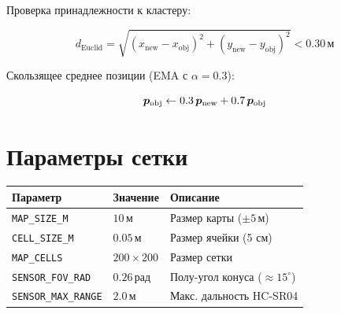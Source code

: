 Проверка принадлежности к кластеру:

\begin{equation}
  d_{\text{Euclid}} = \sqrt{(x_{\text{new}} - x_{\text{obj}})^2 + (y_{\text{new}} - y_{\text{obj}})^2}
  < 0.30\,\text{м}
  \label{eq:cluster_dist}
\end{equation}

Скользящее среднее позиции (EMA с $\alpha = 0.3$):

\begin{equation}
  \bm{p}_{\text{obj}} \leftarrow 0.3\,\bm{p}_{\text{new}} + 0.7\,\bm{p}_{\text{obj}}
  \label{eq:ema_position}
\end{equation}

\section{Параметры сетки}

\begin{center}
\begin{tabular}{lll}
\toprule
\textbf{Параметр} & \textbf{Значение} & \textbf{Описание}\\
\midrule
\texttt{MAP\_SIZE\_M}      & $10\,\text{м}$ & Размер карты ($\pm 5\,\text{м}$)\\
\texttt{CELL\_SIZE\_M}     & $0.05\,\text{м}$ & Размер ячейки (5 см)\\
\texttt{MAP\_CELLS}        & $200 \times 200$ & Размер сетки\\
\texttt{SENSOR\_FOV\_RAD}  & $0.26\,\text{рад}$ & Полу-угол конуса (${\approx}15^\circ$)\\
\texttt{SENSOR\_MAX\_RANGE}& $2.0\,\text{м}$ & Макс. дальность HC-SR04\\
\bottomrule
\end{tabular}
\end{center}
